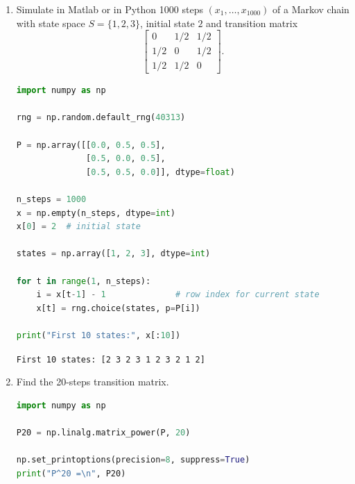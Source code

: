 \documentclass[dvipsnames,11pt]{article}
\begin{document}
    \begin{enumerate}[label=\alph*.]
        \item Simulate in Matlab or in Python 1000 steps $(x_1,\dots,x_{1000})$ of a Markov chain with state space $S=\{1,2,3\}$, initial state $2$ and transition matrix 
            \[
            \left[
            \begin{array}{ccc}
            0 &1/2 &1/2\\
            1/ 2 &0 &1/ 2\\
            1/ 2 &1/ 2& 0
            \end{array}
            \right].
            \]

            \begin{solution}

\begin{lstlisting}[language=python]
import numpy as np

rng = np.random.default_rng(40313)

P = np.array([[0.0, 0.5, 0.5],
              [0.5, 0.0, 0.5],
              [0.5, 0.5, 0.0]], dtype=float)

n_steps = 1000
x = np.empty(n_steps, dtype=int)
x[0] = 2  # initial state

states = np.array([1, 2, 3], dtype=int)

for t in range(1, n_steps):
    i = x[t-1] - 1              # row index for current state
    x[t] = rng.choice(states, p=P[i])

print("First 10 states:", x[:10])
\end{lstlisting}

                \texttt{First 10 states: [2 3 2 3 1 2 3 2 1 2]}
                
            \end{solution}

    
        \item Find the 20-steps transition matrix.

            \begin{solution}

\begin{lstlisting}[language=python]
import numpy as np

P20 = np.linalg.matrix_power(P, 20)

np.set_printoptions(precision=8, suppress=True)
print("P^20 =\n", P20)
\end{lstlisting}
            
            \end{solution}
        

\end{enumerate}
\end{document}
